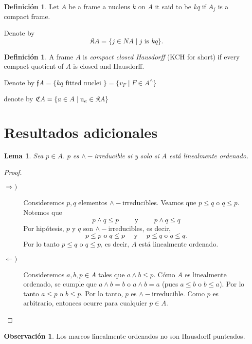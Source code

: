 \documentclass[11pt]{amsart}
\theoremstyle{plain}
\newtheorem{lem}[thm]{Lema}
\theoremstyle{definition}
\newtheorem{dfn}[thm]{Definición}
\newtheorem{obs}[thm]{Observación}
\begin{document}
\begin{dfn}\label{KQ}
Let $A$ be a frame a nucleus $k$ on $A$ it said to be \emph{kq} if $A_{j}$ is a compact frame. 
\end{dfn}
Denote by 
\[
\mathfrak{K}A=\{j\in NA\mid j \text{ is } kq\}.
\]

\begin{dfn}\label{KCH}
A frame $A$ is \emph{compact closed Hausdorff} ({\rm KCH} for short) if every compact quotient of $A$ is closed and Hausdorff.
\end{dfn}



Denote by $\mathfrak{f}A=\{kq\text{ fitted nuclei }\}=\{v_{F}\mid F\in A^{\wedge}\}$




denote by $\mathfrak{C}A=\{a\in A\mid {\rm u}_{a}\in\mathfrak{K}A\}$

\section{Resultados adicionales}

\begin{lem}
    Sea $p\in A$. $p$ es $\wedge-$irreducible si y solo si $A$ está linealmente ordenado.
\end{lem}

\begin{proof}
\begin{description}
    \item[$\Rightarrow )$] Consideremos $p, q$ elementos $\wedge-$irreducibles. Veamos que $p\leq q$ o $q\leq p$. Notemos que 
    \[
    p\wedge q\leq p\qquad \mbox{ y }\qquad p\wedge q\leq q 
    \]
    Por hipótesis, $p$ y $q$ son $\wedge-$irreducibles, es decir, 
    \[
    p\leq p \mbox{ o }q\leq p\quad\mbox{ y }\quad p\leq q \mbox{ o }q\leq q.
    \]
    Por lo tanto $p\leq q$ o $q\leq p$, es decir, $A$ está linealmente ordenado.

    \item[$\Leftarrow )$] Consideremos $a,b, p\in A$ tales que $a\wedge b\leq p$. Cómo $A$ es linealmente ordenado, se cumple que $a\wedge b=b$ o $a\wedge b=a$ (pues $a\leq b$ o $b\leq a$). Por lo tanto $a\leq p$ o $b\leq p$. Por lo tanto, $p$ es $\wedge-$irreducible. Como $p$ es arbitrario, entonces ocurre para cualquier $p\in A$.
\end{description}
\end{proof}

\begin{obs}
    Los marcos linealmente ordenados no son Hausdorff punteados. 
\end{obs}
\end{document}
